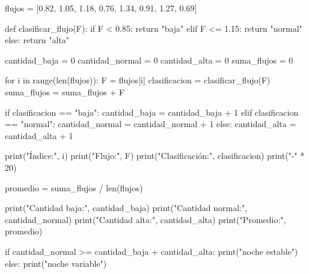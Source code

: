 \begin{solution}
\begin{pythonjupyter}
flujos = [0.82, 1.05, 1.18, 0.76, 1.34, 0.91, 1.27, 0.69]

def clasificar_flujo(F):
    if F < 0.85:
        return "baja"
    elif F <= 1.15:
        return "normal"
    else:
        return "alta"

cantidad_baja = 0
cantidad_normal = 0
cantidad_alta = 0
suma_flujos = 0

for i in range(len(flujos)):
    F = flujos[i]
    clasificacion = clasificar_flujo(F)
    suma_flujos = suma_flujos + F

    if clasificacion == "baja":
        cantidad_baja = cantidad_baja + 1
    elif clasificacion == "normal":
        cantidad_normal = cantidad_normal + 1
    else:
        cantidad_alta = cantidad_alta + 1

    print("Índice:", i)
    print("Flujo:", F)
    print("Clasificación:", clasificacion)
    print("-" * 20)

promedio = suma_flujos / len(flujos)

print("Cantidad baja:", cantidad_baja)
print("Cantidad normal:", cantidad_normal)
print("Cantidad alta:", cantidad_alta)
print("Promedio:", promedio)

if cantidad_normal >= cantidad_baja + cantidad_alta:
    print("noche estable")
else:
    print("noche variable")
\end{pythonjupyter}
\end{solution}
